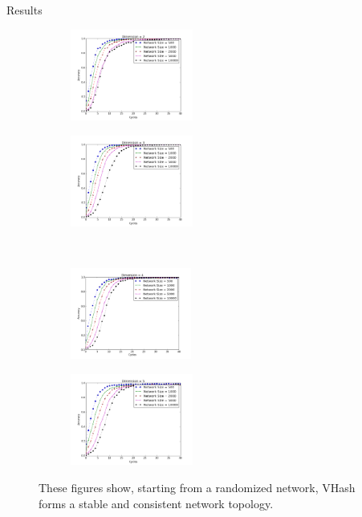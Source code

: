 \documentclass[11pt]{beamer}
\begin{document}
\begin{frame}{Results}
	\begin{figure}
		\label{fig:conv}
		\begin{subfigure}[b]{.45\linewidth}
			\centering
			\includegraphics[height=3cm]{figs/conv_d2}
			\label{conv2}
		\end{subfigure} 
		\begin{subfigure}[b]{.45\linewidth}
			\centering
			\includegraphics[height=3cm]{figs/conv_d3}
			\label{conv3}
		\end{subfigure}\\
		\begin{subfigure}[b]{.45\linewidth}
			\centering
			\includegraphics[height=3cm]{figs/conv_d4}
			\label{conv4}
		\end{subfigure}
		\begin{subfigure}[b]{.45\linewidth}
			\centering
			\includegraphics[height=3cm]{figs/conv_d5}
			\label{conv5}
		\end{subfigure}
		
		\caption{These figures show, starting from a randomized network, VHash forms a stable and consistent network topology. %
		}
		
	\end{figure}
\end{frame}
\end{document}

